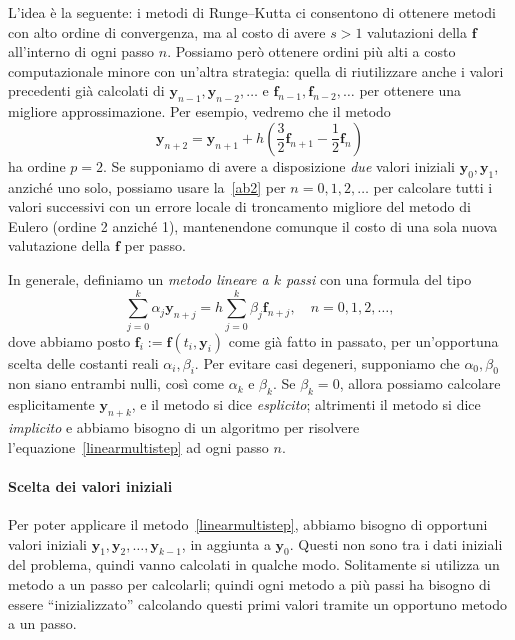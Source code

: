\documentclass[a4paper]{report}
\theoremstyle{definiton}
\theoremstyle{remark}
\newcommand{\y}{\mathbf{y}}
\newcommand{\f}{\mathbf{f}}
\begin{document}
L'idea è la seguente: i metodi di Runge--Kutta ci consentono di ottenere metodi con alto ordine di convergenza, ma al costo di avere $s>1$ valutazioni della $\mathbf{f}$ all'interno di ogni passo $n$. Possiamo però ottenere ordini più alti a costo computazionale minore con un'altra strategia: quella di riutilizzare anche i valori precedenti già calcolati di $\y_{n-1}, \y_{n-2}, \dots$ e $\f_{n-1},\f_{n-2},\dots$ per ottenere una migliore approssimazione. Per esempio, vedremo che il metodo
\begin{equation} \label{ab2}
    \y_{n+2} = \y_{n+1} + h\left(\frac32 \f_{n+1} - \frac12 \f_n\right)    
\end{equation}
ha ordine $p=2$. Se supponiamo di avere a disposizione \emph{due} valori iniziali $\y_0, \y_1$, anziché uno solo, possiamo usare la~\eqref{ab2} per $n=0,1,2,\dots$ per calcolare tutti i valori successivi con un errore locale di troncamento migliore del metodo di Eulero (ordine 2 anziché 1), mantenendone comunque il costo di una sola nuova valutazione della $\f$ per passo.

In generale, definiamo un \emph{metodo lineare a $k$ passi} con una formula del tipo
\begin{equation} \label{linearmultistep}
    \sum_{j=0}^k \alpha_j \y_{n+j} = h\sum_{j=0}^k \beta_j \f_{n+j}, \quad n=0,1,2,\dots,    
\end{equation}
dove abbiamo posto $\f_i := \f(t_i, \y_i)$ come già fatto in passato, per un'opportuna scelta delle costanti reali $\alpha_i, \beta_i$. Per evitare casi degeneri, supponiamo che $\alpha_0,\beta_0$ non siano entrambi nulli, così come $\alpha_k$ e $\beta_k$. Se $\beta_k=0$, allora possiamo calcolare esplicitamente $\y_{n+k}$, e il metodo si dice \emph{esplicito}; altrimenti il metodo si dice \emph{implicito} e abbiamo bisogno di un algoritmo per risolvere l'equazione~\eqref{linearmultistep} ad ogni passo $n$.

\paragraph{Scelta dei valori iniziali} Per poter applicare il metodo~\eqref{linearmultistep}, abbiamo bisogno di opportuni valori iniziali $\y_1,\y_2,\dots, \y_{k-1}$, in aggiunta a $\y_0$. Questi non sono tra i dati iniziali del problema, quindi vanno calcolati in qualche modo. Solitamente si utilizza un metodo a un passo per calcolarli; quindi ogni metodo a più passi ha bisogno di essere ``inizializzato'' calcolando questi primi valori tramite un opportuno metodo a un passo.
\end{document}

